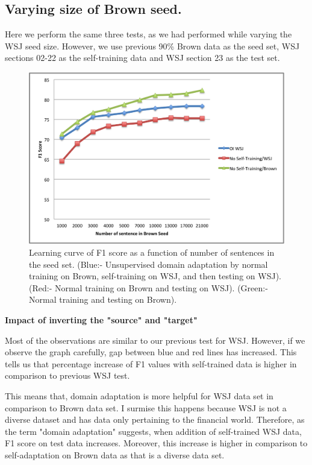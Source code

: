 \newpage
\subsection {Varying size of Brown seed.}

Here we perform the same three tests, as we had performed while varying the WSJ seed size. However, we use previous 90\% Brown data as the seed set, WSJ sections 02-22 as the self-training data and WSJ section 23 as the test set.

\begin{figure}[ht!]
\centering
\includegraphics[width=140mm]{exp3.png}
\caption{Learning curve of F1 score as a function of number of sentences in the seed set. (Blue:- Unsupervised domain adaptation by normal training on Brown, self-training on WSJ, and then testing on WSJ). (Red:- Normal training on Brown and testing on WSJ). (Green:- Normal training and testing on Brown).}
\label{accuracy}
\end{figure}

\textbf {Impact of inverting the "source" and "target"}

Most of the observations are similar to our previous test for WSJ. However, if we observe the graph carefully, gap between blue and red lines has increased. This tells us that percentage increase of F1 values with self-trained data is higher in comparison to previous WSJ test. 

This means that, domain adaptation is more helpful for WSJ data set in comparison to Brown data set. I surmise this happens because WSJ is not a diverse dataset and has data only pertaining to the financial world. Therefore, as the term "domain adaptation" suggests, when addition of self-trained WSJ data, F1 score on test data increases. Moreover, this increase is higher in comparison to self-adaptation on Brown data as that is a diverse data set.

